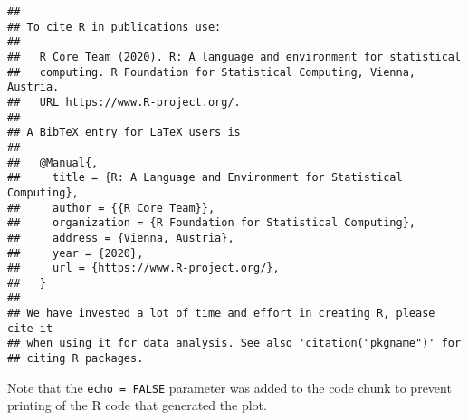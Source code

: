 \documentclass[
]{article}
\begin{document}
\begin{verbatim}
## 
## To cite R in publications use:
## 
##   R Core Team (2020). R: A language and environment for statistical
##   computing. R Foundation for Statistical Computing, Vienna, Austria.
##   URL https://www.R-project.org/.
## 
## A BibTeX entry for LaTeX users is
## 
##   @Manual{,
##     title = {R: A Language and Environment for Statistical Computing},
##     author = {{R Core Team}},
##     organization = {R Foundation for Statistical Computing},
##     address = {Vienna, Austria},
##     year = {2020},
##     url = {https://www.R-project.org/},
##   }
## 
## We have invested a lot of time and effort in creating R, please cite it
## when using it for data analysis. See also 'citation("pkgname")' for
## citing R packages.
\end{verbatim}

Note that the \texttt{echo\ =\ FALSE} parameter was added to the code
chunk to prevent printing of the R code that generated the plot.
\end{document}
